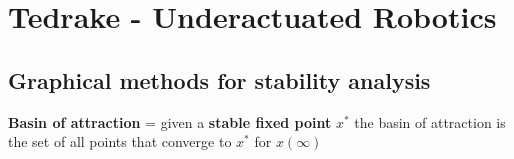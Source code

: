 \section{Tedrake - Underactuated Robotics}
\subsection*{Graphical methods for stability analysis}
\textbf{Basin of attraction} = given a \textbf{stable fixed point} $x^*$ the basin of attraction is the set of all points that converge to $x^*$ for $x(\infty)$